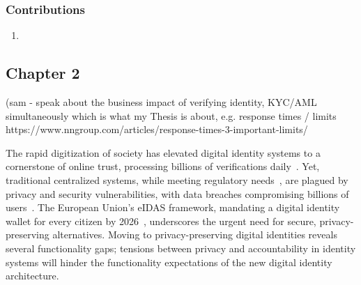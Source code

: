 \subsubsection{Contributions}
\begin{enumerate}
    \item 
\end{enumerate}









\subsection{Chapter 2}






























(sam - speak about the business impact of verifying identity, KYC/AML simultaneously which is what my Thesis is about, e.g. response times / limits https://www.nngroup.com/articles/response-times-3-important-limits/ 



The rapid digitization of society has elevated digital identity systems to a cornerstone of online trust, processing billions of verifications daily~\cite{noauthor_happy_2021, pang_zanzibar_2019}. Yet, traditional centralized systems, while meeting regulatory needs~\cite{eltayeb_crucial_2024}, are plagued by privacy and security vulnerabilities, with data breaches compromising billions of users~\cite{zhang_data_2022}. The European Union’s eIDAS framework, mandating a digital identity wallet for every citizen by 2026~\cite{noauthor_regulation_2024}, underscores the urgent need for secure, privacy-preserving alternatives. Moving to privacy-preserving digital identities reveals several functionality gaps; tensions between privacy and accountability in identity systems will hinder the functionality expectations of the new digital identity architecture. 


